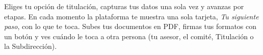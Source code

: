 \documentclass[11pt,a4paper]{article}
\begin{document}
{\small\tableofcontents}
\newpage
\begin{quevasahacer}
Eliges tu opción de titulación, capturas tus datos una sola vez y avanzas por etapas. En cada momento la plataforma te muestra una sola tarjeta, \emph{Tu siguiente paso}, con lo que te toca. Subes tus documentos en PDF, firmas tus formatos con un botón y ves cuándo le toca a otra persona (tu asesor, el comité, Titulación o la Subdirección).
\end{quevasahacer}




\end{document}
